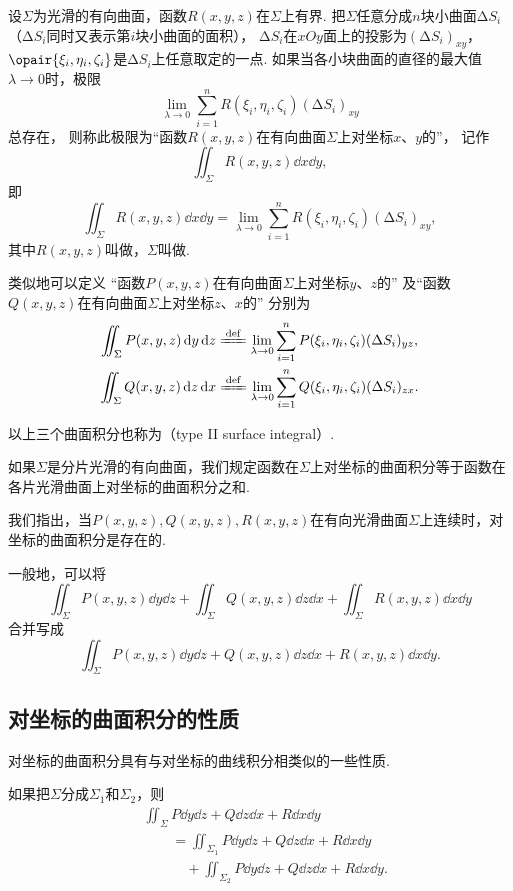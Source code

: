 设\(\Sigma\)为光滑的有向曲面，函数\(R(x,y,z)\)在\(\Sigma\)上有界.
把\(\Sigma\)任意分成\(n\)块小曲面\(\increment S_i\)%
（\(\increment S_i\)同时又表示第\(i\)块小曲面的面积），
\(\increment S_i\)在\(xOy\)面上的投影为\((\increment S_i)_{xy}\)，
\(\opair{\xi_i,\eta_i,\zeta_i}\)是\(\increment S_i\)上任意取定的一点.
如果当各小块曲面的直径的最大值\(\lambda\to0\)时，极限\[
	\lim\limits_{\lambda\to0} \sum\limits_{i=1}^n R(\xi_i,\eta_i,\zeta_i) (\increment S_i)_{xy}
\]总存在，
则称此极限为“函数\(R(x,y,z)\)在有向曲面\(\Sigma\)上对坐标\(x\)、\(y\)的”，
记作\[
	\iint_{\Sigma} R(x,y,z) \dd{x}\dd{y},
\]
即\[
	\iint_{\Sigma} R(x,y,z) \dd{x}\dd{y}
	=\lim\limits_{\lambda\to0} \sum\limits_{i=1}^n R(\xi_i,\eta_i,\zeta_i) (\increment S_i)_{xy},
\]
其中\(R(x,y,z)\)叫做，\(\Sigma\)叫做.

类似地可以定义
“函数\(P(x,y,z)\)在有向曲面\(\Sigma\)上对坐标\(y\)、\(z\)的”
及“函数\(Q(x,y,z)\)在有向曲面\(\Sigma\)上对坐标\(z\)、\(x\)的”
分别为\begin{gather*}
	\iint_{\Sigma} P(x,y,z) \dd{y}\dd{z}
	\defeq
	\lim\limits_{\lambda\to0}
	\sum\limits_{i=1}^n P(\xi_i,\eta_i,\zeta_i) (\increment S_i)_{yz}, \\
	\iint_{\Sigma} Q(x,y,z) \dd{z}\dd{x}
	\defeq
	\lim\limits_{\lambda\to0}
	\sum\limits_{i=1}^n Q(\xi_i,\eta_i,\zeta_i) (\increment S_i)_{zx}.
\end{gather*}

以上三个曲面积分也称为（type II surface integral）.

如果\(\Sigma\)是分片光滑的有向曲面，我们规定函数在\(\Sigma\)上对坐标的曲面积分等于函数在各片光滑曲面上对坐标的曲面积分之和.

我们指出，当\(P(x,y,z),Q(x,y,z),R(x,y,z)\)在有向光滑曲面\(\Sigma\)上连续时，对坐标的曲面积分是存在的.

一般地，可以将\[
\iint_{\Sigma} P(x,y,z) \dd{y}\dd{z}
+\iint_{\Sigma} Q(x,y,z) \dd{z}\dd{x}
+\iint_{\Sigma} R(x,y,z) \dd{x}\dd{y}
\]合并写成\[
\iint_{\Sigma}{P(x,y,z)\dd{y}\dd{z}+Q(x,y,z)\dd{z}\dd{x}+R(x,y,z)\dd{x}\dd{y}}.
\]

\subsection{对坐标的曲面积分的性质}
对坐标的曲面积分具有与对坐标的曲线积分相类似的一些性质.
\begin{property}
如果把\(\Sigma\)分成\(\Sigma_1\)和\(\Sigma_2\)，则\begin{align*}
&\iint_{\Sigma}{P\dd{y}\dd{z}+Q\dd{z}\dd{x}+R\dd{x}\dd{y}} \\
&\qquad=\iint_{\Sigma_1}{P\dd{y}\dd{z}+Q\dd{z}\dd{x}+R\dd{x}\dd{y}} \\
&\qquad\quad+\iint_{\Sigma_2}{P\dd{y}\dd{z}+Q\dd{z}\dd{x}+R\dd{x}\dd{y}}.
\end{align*}
\end{property}

